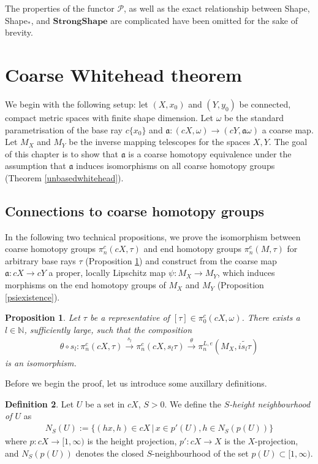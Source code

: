 \documentclass[a4paper,11pt]{article}
\theoremstyle{definition}
\newtheorem{definition}{Definition}[section]
\theoremstyle{plain}
\newtheorem{prop}[definition]{Proposition}
\theoremstyle{remark}
\begin{document}
{The properties of the functor $\mathcal{P}$, as well as the exact relationship between Shape, Shape$_{\ast}$, and $\mathbf{StrongShape}$ are complicated have been omitted for the sake of brevity. 
\newpage
\section{Coarse Whitehead theorem}

We begin with the following setup: let $(X,x_0)$ and $(Y,y_0)$ be connected, compact metric spaces with finite shape dimension. Let $\omega$ be the standard parametrisation of the base ray $c\{x_0\}$ and $\mathfrak{a}:(cX,\omega)\rightarrow (cY,\mathfrak{a}\omega)$ a coarse map. Let $M_X$ and $M_Y$ be the inverse mapping telescopes for the spaces $X,Y$. The goal of this chapter is to show that $\mathfrak{a}$ is a coarse homotopy equivalence under the assumption that $\mathfrak{a}$ induces isomorphisms on all coarse homotopy groups (Theorem \ref{unbasedwhitehead}).

\subsection{Connections to coarse homotopy groups}

In the following two technical propositions, we prove the isomorphism between coarse homotopy groups $\pi^c_n(cX,\tau)$ and end homotopy groups $\pi^e_{n}(M,\tau)$ for arbitrary base rays $\tau$ (Proposition \ref{isogeneralray}) and construct from the coarse map $\mathfrak{a}: cX\rightarrow cY$ a proper, locally Lipschitz map $\psi: M_{X}\rightarrow M_{Y}$, which induces morphisms on the end homotopy groups of $M_{X}$ and $M_{Y}$ (Proposition \ref{psiexistence}). 



\begin{prop} \label{isogeneralray}  Let $\tau$ be a representative of $[\tau]\in \pi_{0}^{c}(cX,\omega)$. There exists a $l\in \mathbb{N}$, sufficiently large, such that the composition 
\begin{align*}
\theta \circ s_{l}: \pi_{n}^c(cX,\tau)\xrightarrow{s_{l}}  \pi_{n}^{c}(cX, s_{l} \tau) \xrightarrow{\theta} \pi_{n}^{L,e}(M_{X},\widetilde{is_{l}\tau})  
\end{align*}
is an isomorphism. 
\end{prop}

Before we begin the proof, let us introduce some auxillary definitions. 

\begin{definition} Let $U$ be a set in $cX$, $S>0$. We define the \textit{$S$-height neighbourhood of $U$} as 
\begin{align*}
N_{S}(U) := \{(hx,h)\in cX\,|\, x\in p'(U), h\in N_{S}(p(U))\}
\end{align*}
where $p:cX\rightarrow [1,\infty)$ is the height projection, $p':cX\rightarrow X$ is the $X$-projection, and $N_{S}(p(U))$ denotes the closed $S$-neighbourhood of the set $p(U)\subset [1,\infty)$. 
\end{definition}

}
\end{document}
